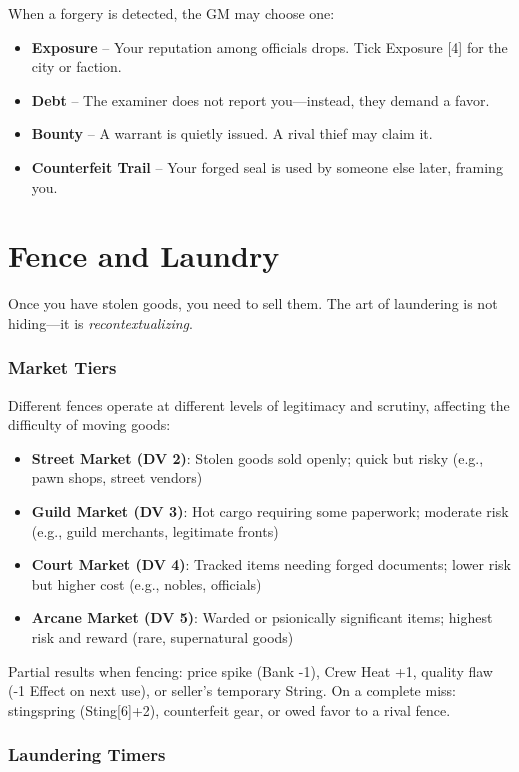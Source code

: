 \documentclass[10pt,twoside]{book}
\begin{document}
When a forgery is detected, the GM may choose one:

\begin{itemize}
\item \textbf{Exposure} -- Your reputation among officials drops. Tick Exposure [4] for the city or faction.
\item \textbf{Debt} -- The examiner does not report you---instead, they demand a favor.
\item \textbf{Bounty} -- A warrant is quietly issued. A rival thief may claim it.
\item \textbf{Counterfeit Trail} -- Your forged seal is used by someone else later, framing you.
\end{itemize}

\chapter{Fence and Laundry}

Once you have stolen goods, you need to sell them. The art of laundering is not hiding---it is \emph{recontextualizing}.

\subsection{Market Tiers}
Different fences operate at different levels of legitimacy and scrutiny, affecting the difficulty of moving goods:
\begin{itemize}
\item \textbf{Street Market (DV 2)}: Stolen goods sold openly; quick but risky (e.g., pawn shops, street vendors)
\item \textbf{Guild Market (DV 3)}: Hot cargo requiring some paperwork; moderate risk (e.g., guild merchants, legitimate fronts)
\item \textbf{Court Market (DV 4)}: Tracked items needing forged documents; lower risk but higher cost (e.g., nobles, officials)
\item \textbf{Arcane Market (DV 5)}: Warded or psionically significant items; highest risk and reward (rare, supernatural goods)
\end{itemize}
Partial results when fencing: price spike (Bank -1), Crew Heat +1, quality flaw (-1 Effect on next use), or seller's temporary String.
On a complete miss: stingspring (Sting[6]+2), counterfeit gear, or owed favor to a rival fence.


\subsection{Laundering Timers}
\end{document}
